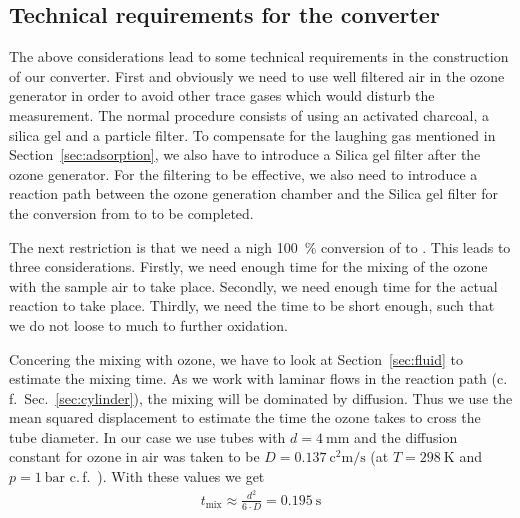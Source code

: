 \subsection{Technical requirements for the converter}
\label{sec:requirements}

The above considerations lead to some technical requirements in the
construction of our converter. First and obviously we need to use well
filtered air in the ozone generator in order to avoid other trace
gases which would disturb the measurement. The normal procedure
consists of using an activated charcoal, a silica gel and a particle
filter. To compensate for the laughing gas mentioned in
Section~\ref{sec:adsorption}, we also have to introduce a Silica gel
filter after the ozone generator. For the filtering to be effective,
we also need to introduce a reaction path between the ozone generation
chamber and the Silica gel filter for the conversion from  to
 to be completed.

The next restriction is that we need a nigh \SI{100}{\%} conversion of
 to . This leads to three considerations. Firstly, we
need enough time for the mixing of the ozone with the sample air to
take place. Secondly, we need enough time for the actual reaction to
take place. Thirdly, we need the time to be short enough, such that we
do not loose to much  to further oxidation.

Concering the mixing with ozone, we have to look at
Section~\ref{sec:fluid} to estimate the mixing time. As we work with
laminar flows in the reaction path (c.\,f.\ Sec.~\ref{sec:cylinder}),
the mixing will be dominated by diffusion. Thus we use the mean
squared displacement to estimate the time the ozone takes to cross the
tube diameter. In our case we use tubes with $d =
\SI{4}{\milli\meter}$ and the diffusion constant for ozone in air was
taken to be $D = \SI{0.137}{\square\centi\meter\per\second}$ (at $T =
\SI{298}{\kelvin}$ and $p = \SI{1}{\text{bar}}$
c.\,f.~\cite{diff-ozone}). With these values we get
\begin{align*}
  t_{\text{mix}} \approx \frac{d^2}{6\cdot D} = \SI{0.195}{\second}
\end{align*}

